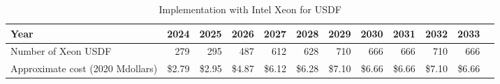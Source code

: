 \tiny \begin{longtable} { |p{}  |r  |r  |r  |r  |r  |r  |r  |r  |r  |r  |r |} 
\caption{Implementation with Intel Xeon for USDF \label{tab:opsXeonUSDF}}\\ 
\hline 
\textbf{Year}&\textbf{2024}&\textbf{2025}&\textbf{2026}&\textbf{2027}&\textbf{2028}&\textbf{2029}&\textbf{2030}&\textbf{2031}&\textbf{2032}&\textbf{2033} \\ \hline
{Number of Xeon USDF}&{279}&{295}&{487}&{612}&{628}&{710}&{666}&{666}&{710}&{666} \\ \hline
{Approximate cost (2020 Mdollars)}&{\$2.79}&{\$2.95}&{\$4.87}&{\$6.12}&{\$6.28}&{\$7.10}&{\$6.66}&{\$6.66}&{\$7.10}&{\$6.66} \\ \hline
\end{longtable} \normalsize
